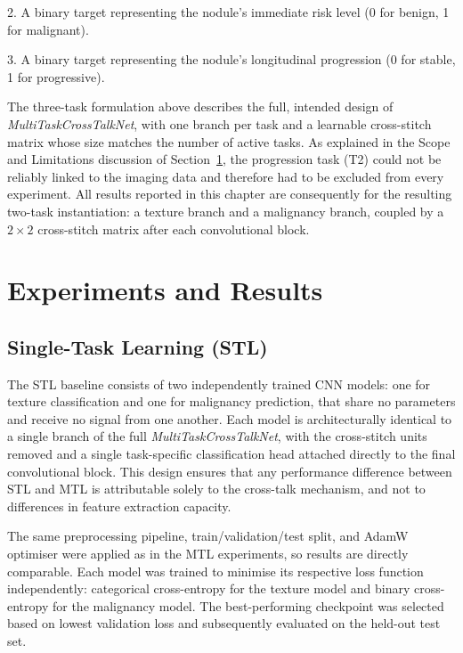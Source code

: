 2. A binary target representing the nodule's immediate risk level (0 for benign, 1 for malignant).

3. A binary target representing the nodule's longitudinal progression (0 for stable, 1 for progressive).

The three-task formulation above describes the full, intended design of \textit{MultiTaskCrossTalkNet}, with one branch per task and a learnable cross-stitch matrix whose size matches the number of active tasks. As explained in the Scope and Limitations discussion of Section~\ref{section:experimentsAndResults}, the progression task (T2) could not be reliably linked to the imaging data and therefore had to be excluded from every experiment. All results reported in this chapter are consequently for the resulting two-task instantiation: a texture branch and a malignancy branch, coupled by a $2 \times 2$ cross-stitch matrix after each convolutional block.


\section{Experiments and Results}
\label{section:experimentsAndResults}

\subsection{Single-Task Learning (STL)}

The STL baseline consists of two independently trained CNN models: one for texture classification and one for malignancy prediction, that share no parameters and receive no signal from one another. Each model is architecturally identical to a single branch of the full \textit{MultiTaskCrossTalkNet}, with the cross-stitch units removed and a single task-specific classification head attached directly to the final convolutional block. This design ensures that any performance difference between STL and MTL is attributable solely to the cross-talk mechanism, and not to differences in feature extraction capacity.

The same preprocessing pipeline, train/validation/test split, and AdamW optimiser were applied as in the MTL experiments, so results are directly comparable. Each model was trained to minimise its respective loss function independently: categorical cross-entropy for the texture model and binary cross-entropy for the malignancy model. The best-performing checkpoint was selected based on lowest validation loss and subsequently evaluated on the held-out test set.

